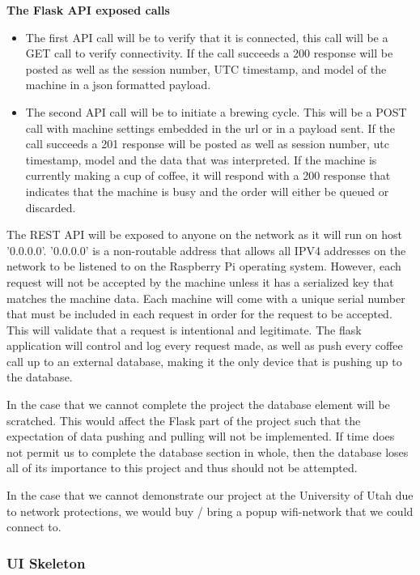 \documentclass[conference]{IEEEtran}
\begin{document}
\indent\textbf{The Flask API exposed calls} \\ 
\begin{itemize}
\item The first API call will be to verify that it is connected, this call will
be a GET call to verify connectivity. If the call succeeds a 200 response will
be posted as well as the session number, UTC timestamp, and model of the
machine in a json formatted payload.

\item The second API call will be to initiate a brewing cycle. 
This will be a POST call with machine settings embedded in the url or in a payload sent. If the
call succeeds a 201 response will be posted as well as session number, utc
timestamp, model and the data that was interpreted. If the machine is currently
making a cup of coffee, it will respond with a 200 response that indicates that
the machine is busy and the order will either be queued or discarded.
\end{itemize}

The REST API will be exposed to anyone on the network as it will run on host
'0.0.0.0'. '0.0.0.0' is a non-routable address that allows all IPV4 addresses
on the network to be listened to on the Raspberry Pi operating system.
However, each request will not be accepted by the machine unless it has a
serialized key that matches the machine data. Each machine will come with a
unique serial number that must be included in each request in order for the
request to be accepted. This will validate that a request is intentional and
legitimate.
The flask application will control and log every request made, as well as push
every coffee call up to an external database, making it the only device that is
pushing up to the database.

 In the case that we cannot complete the project the database element will be
scratched. This would affect the Flask part of the project such that the
expectation of data pushing and pulling will not be implemented.
If time does not permit us to complete the database section in whole, then the database loses all 
of its importance to this project and thus should not be attempted.

In the case that we cannot demonstrate our project at the University of Utah due to network protections,
we would buy / bring a popup wifi-network that we could connect to.

\subsubsection{UI Skeleton}
\end{document}

